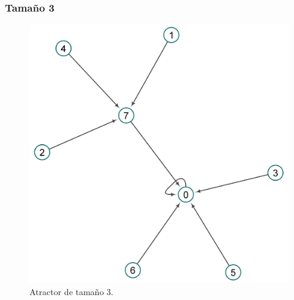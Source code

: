 \documentclass[11pt]{article}
\begin{document}
			\subsubsection{Tamaño 3}
			\begin{figure}[H]
			\centering
			\includegraphics[scale=0.1]{resources/Atractores22/atractor_22_size_3.png}
			\caption{Atractor de tamaño 3.}\label{fig:picture}
			\end{figure}
\end{document}
